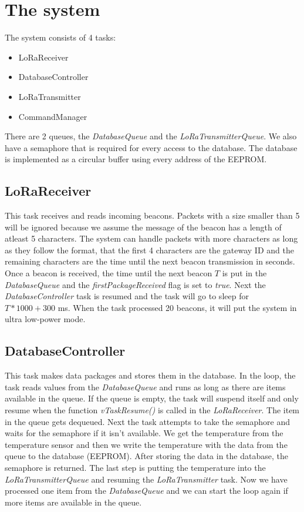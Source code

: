 \documentclass{scrartcl}
\begin{document}


\pagestyle{scrheadings}
\clearscrheadfoot

\cfoot{\pagemark}

\newpage

\section{The system}
The system consists of 4 tasks:
\begin{itemize}
    \item LoRaReceiver
    \item DatabaseController
    \item LoRaTransmitter
    \item CommandManager
\end{itemize}

There are 2 queues, the \textit{DatabaseQueue} and the \textit{LoRaTransmitterQueue}.
We also have a semaphore that is required for every access to the database.
The database is implemented as a circular buffer using every address of the EEPROM.

\subsection{LoRaReceiver}
This task receives and reads incoming beacons. Packets with a size smaller than 5 will be ignored because
we assume the message of the beacon has a length of atleast 5 characters. The system can handle packets with more characters
as long as they follow the format, that the first 4 characters are the gateway ID and the remaining characters are the time until the
next beacon transmission in seconds. Once a beacon is received, the time until the next beacon $T$ is put in the \textit{DatabaseQueue} and
the \textit{firstPackageReceived} flag is set to \textit{true}.
Next the \textit{DatabaseController} task is resumed and the task will go to sleep for $T*1000 + 300$ \si{\milli\second}.
When the task processed 20 beacons, it will put the system in ultra low-power mode.

\subsection{DatabaseController}
This task makes data packages and stores them in the database.
In the loop, the task reads values from the \textit{DatabaseQueue} and runs as long as there are items available in the queue.
If the queue is empty, the task will suspend itself and only resume when the function \textit{vTaskResume()} is called in the \textit{LoRaReceiver}.
The item in the queue gets dequeued. Next the task attempts to take the semaphore and waits for the semaphore if it isn't available.
We get the temperature from the temperature sensor and then we write the temperature with the data from the queue to the database (EEPROM).
After storing the data in the database, the semaphore is returned.
The last step is putting the temperature into the \textit{LoRaTransmitterQueue} and resuming the \textit{LoRaTransmitter} task.
Now we have processed one item from the \textit{DatabaseQueue} and we can start the loop again if more items are available in the queue.
\end{document}
